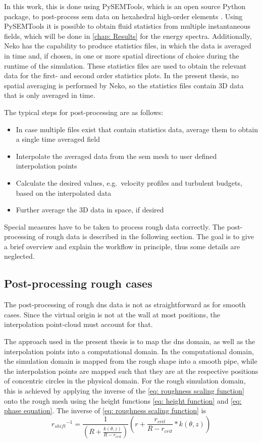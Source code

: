 In this work, this is done using PySEMTools, which is an open source Python package, to post-process \acrshort{sem} data on hexahedral high-order elements \citep{perezPySEMToolsLibraryPostprocessing2026}.
Using PySEMTools it is possible to obtain fluid statistics from multiple instantaneous fields, which will be done in \autoref{chap: Results} for the energy spectra.
Additionally, Neko has the capability to produce statistics files, in which the data is averaged in time and, if chosen, in one or more spatial directions of choice during the runtime of the simulation.
These statistics files are used to obtain the relevant data for the first- and second order statistics plots.
In the present thesis, no spatial averaging is performed by Neko, so the statistics files contain 3D data that is only averaged in time.

The typical steps for post-processing are as follows:
\begin{itemize}
    \item In case multiple files exist that contain statistics data, average them to obtain a single time averaged field
    \item Interpolate the averaged data from the \acrshort{sem} mesh to user defined interpolation points
    \item Calculate the desired values, e.g.\ velocity profiles and turbulent budgets, based on the interpolated data
    \item Further average the 3D data in space, if desired
\end{itemize}
Special measures have to be taken to process rough data correctly.
The post-processing of rough data is described in the following section. 
The goal is to give a brief overview and explain the workflow in principle, thus some details are neglected.
\subsection{Post-processing rough cases}\label{subsec: Postprocessing rough cases}
The post-processing of rough \acrshort{dns} data is not as straightforward as for smooth cases.
Since the virtual origin is not at the wall at most positions, the interpolation point-cloud  must account for that.


The approach used in the present thesis is to map the \acrshort{dns} domain, as well as the interpolation points into a computational domain.
In the computational domain, the simulation domain is mapped from the rough shape into a smooth pipe, while the interpolation points are mapped such that they are at the respective positions of concentric circles in the physical domain.
For the rough simulation domain, this is achieved by applying the inverse of the \autoref{eq: roughness scaling function} onto the rough mesh using the height functions \autoref{eq: height function} and \autoref{eq: phase equation}.
The inverse of \autoref{eq: roughness scaling function} is
\begin{equation}\label{eq: inverse height function}
     {r_{shift}}^{-1} = \frac{1}{\left(R + \frac{k(\theta, z)}{R - r_{crit}}\right)} \left(r + \frac{r_{crit}}{R - r_{crit}} * k(\theta, z)\right)
\end{equation}

